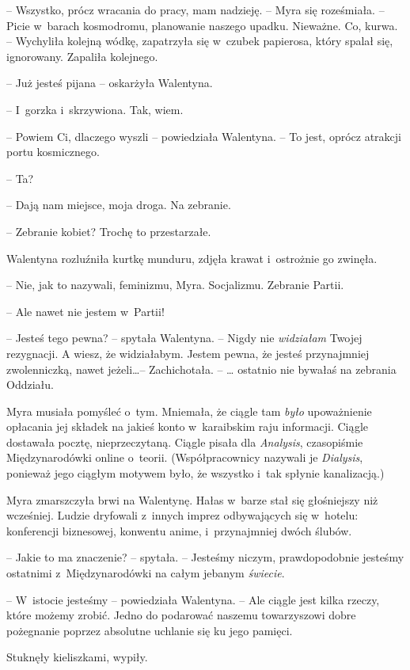 \documentclass[oneside,polish,11pt,sfheadings]{mwbk}
\begin{document}
-- Wszystko, prócz wracania do pracy, mam nadzieję. -- Myra się
roześmiała. -- Picie w~barach kosmodromu, planowanie naszego upadku.
Nieważne. Co, kurwa. -- Wychyliła kolejną wódkę, zapatrzyła się w~czubek
papierosa, który spalał się, ignorowany. Zapaliła kolejnego.

-- Już jesteś pijana -- oskarżyła Walentyna.

-- I~gorzka i~skrzywiona. Tak, wiem.

-- Powiem Ci, dlaczego wyszli -- powiedziała Walentyna. -- To jest, oprócz
atrakcji portu kosmicznego.

-- Ta?

-- Dają nam miejsce, moja droga. Na zebranie.

-- Zebranie kobiet? Trochę to przestarzałe.

Walentyna rozluźniła kurtkę munduru, zdjęła krawat i~ostrożnie go
zwinęła. 

-- Nie, jak to nazywali, feminizmu, Myra. Socjalizmu. Zebranie
Partii.

-- Ale nawet nie jestem w~Partii!

-- Jesteś tego pewna? -- spytała Walentyna. -- Nigdy nie \textit{widziałam}
Twojej rezygnacji. A wiesz, że widziałabym. Jestem pewna, że jesteś
przynajmniej zwolenniczką, nawet jeżeli\ldots -- Zachichotała. -- \ldots
ostatnio nie bywałaś na zebrania Oddziału.

Myra musiała pomyśleć o~tym. Mniemała, że ciągle tam \textit{było}
upoważnienie opłacania jej składek na jakieś konto w~karaibskim raju
informacji. Ciągle dostawała pocztę, nieprzeczytaną. Ciągle pisała dla
\textit{Analysis}, czasopiśmie Międzynarodówki online o~teorii.
(Współpracownicy nazywali je \textit{Dialysis}, ponieważ jego ciągłym
motywem było, że wszystko i~tak spłynie kanalizacją.)

Myra zmarszczyła brwi na Walentynę. Hałas w~barze stał się głośniejszy
niż wcześniej. Ludzie dryfowali z~innych imprez odbywających się w~hotelu: konferencji biznesowej, konwentu anime, i~przynajmniej dwóch
ślubów.

-- Jakie to ma znaczenie? -- spytała. -- Jesteśmy niczym, prawdopodobnie
jesteśmy ostatnimi z~Międzynarodówki na całym jebanym \textit{świecie}.

-- W~istocie jesteśmy -- powiedziała Walentyna. -- Ale ciągle jest kilka
rzeczy, które możemy zrobić. Jedno do podarować naszemu towarzyszowi
dobre pożegnanie poprzez absolutne uchlanie się ku jego pamięci.

Stuknęły kieliszkami, wypiły.
\end{document}

